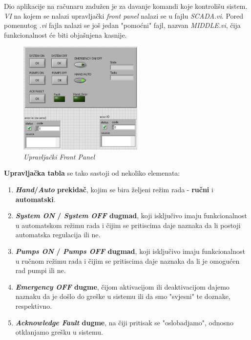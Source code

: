 \documentclass[12pt, titlepage]{article}
\begin{document}
            Dio aplikacije na računaru zadužen je za davanje komandi koje kontrolišu sistem.
            \textit{VI} na kojem se nalazi upravljački \textit{front panel} nalazi se u fajlu \textit{SCADA.vi}.
            Pored pomenutog \textit{.vi} fajla nalazi se još jedan "pomoćni" fajl, nazvan \textit{MIDDLE.vi}, 
            čija funkcionalnost će biti objašnjena kasnije.

            \begin{figure}[ht]
                \centering
                \includegraphics[width=0.55\textwidth]{Slike/SCADA.vi FRONT PANEL.png}
                \caption{\textit{Upravljački Front Panel}}
            \end{figure}

            \textbf{Upravljačka tabla} se tako sastoji od nekoliko elemenata:

            \begin{enumerate}
                \item \textbf{\textit{Hand}/\textit{Auto} prekidač}, kojim se bira željeni režim rada - \textbf{ručni} i \textbf{automatski}.
                \item \textbf{\textit{System ON} / \textit{System OFF} dugmad}, koji isključivo
                imaju funkcionalnost u automatskom režimu rada i čijim se pritiscima daje naznaka da li postoji
                automatska regulacija ili ne.
                \item \textbf{\textit{Pumps ON} / \textit{Pumps OFF} dugmad}, koji isključivo
                imaju funkcionalnost u ručnom režimu rada i čijim se pritiscima daje naznaka da li je omogućen
                rad pumpi ili ne.
                \item \textbf{\textit{Emergency OFF} dugme}, čijom aktivacijom ili deaktivacijom dajemo 
                naznaku da je došlo do greške u sistemu ili da smo "svjesni" te doznake, respektivno.
                \item \textbf{\textit{Acknowledge Fault} dugme}, na čiji pritisak se "oslobadjamo", odnosno
                otklanjamo grešku u sistemu.
            \end{enumerate}
\end{document}

